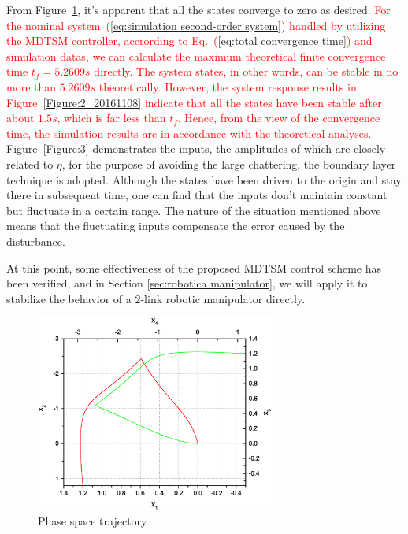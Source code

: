 \documentclass[3p]{elsarticle}
\theoremstyle{plain}
\theoremstyle{remark}
\begin{document}
From Figure~\ref{Figure:2}, it's apparent that all the states converge to zero as desired. \textcolor{red}{For the nominal system~(\ref{eq:simulation second-order system}) handled by utilizing the MDTSM controller, accrording to Eq.~(\ref{eq:total convergence time}) and simulation datas, we can calculate the maximum theoretical finite convergence time $t_f=5.2609s$ directly. The system states, in other words, can be stable in no more than $5.2609s$ theoretically. However, the system response results in Figure~\ref{Figure:2_20161108} indicate that all the states have been stable after about $1.5s$, which is far less than $t_f$. Hence, from the view of the convergence time, the simulation results are in accordance with the theoretical analyses.} Figure~\ref{Figure:3} demonstrates the inputs, the amplitudes of which are closely related to $\eta$, for the purpose of avoiding the large chattering, the boundary layer technique is adopted. Although the states have been driven to the origin and stay there in subsequent time, one can find that the inputs don't maintain constant but fluctuate in a certain range. The nature of the situation mentioned above means that the fluctuating inputs compensate the error caused by the disturbance.\par
At this point, some effectiveness of the proposed MDTSM control scheme has been verified, and in Section \ref{sec:robotica manipulator}, we will apply it to stabilize the behavior of a $2$-link robotic manipulator directly.
\begin{figure}
\centering
\includegraphics[width=0.7\textwidth]{paper3_fig2.eps}
\caption{Phase space trajectory}
\label{Figure:2}
\end{figure}
\end{document}
